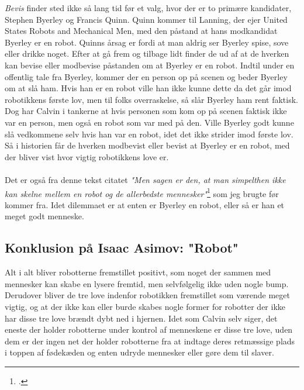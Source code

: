 \textit{Bevis} finder sted ikke så lang tid før et valg, hvor der er to primære kandidater, Stephen Byerley og Francis Quinn. Quinn kommer til Lanning, der ejer United States Robots and Mechanical Men,
med den påstand at hans modkandidat Byerley er en robot. Quinns årsag er fordi at man aldrig ser Byerley spise, sove eller drikke noget. Efter at gå frem og tilbage lidt finder de ud af
at de hverken kan bevise eller modbevise påstanden om at Byerley er en robot. Indtil under en offentlig tale fra Byerley, kommer der en person op på scenen og beder Byerley om at slå ham. Hvis han
er en robot ville han ikke kunne dette da det går imod robotikkens første lov, men til folks overraskelse, så slår Byerley ham rent faktisk. Dog har Calvin i tankerne at hvis personen som kom op
på scenen faktisk ikke var en person, men også en robot som var med på den. Ville Byerley godt kunne slå vedkommene selv hvis han var en robot, idet det ikke strider imod første lov. Så i
historien får de hverken modbevist eller bevist at Byerley er en robot, med der bliver vist hvor vigtig robotikkens love er.
\\
\\
Det er også fra denne tekst citatet \textit{"Men sagen er den, at man simpelthen ikke kan skelne mellem en robot og de allerbedste mennesker"}\footcite[194, l. 5]{robot} som jeg brugte
før kommer fra. Idet dilemmaet er at enten er Byerley en robot, eller så er han et meget godt menneske.

\subsection{Konklusion på Isaac Asimov: "Robot"}

Alt i alt bliver robotterne fremstillet positivt, som noget der sammen med mennesker kan skabe en lysere fremtid, men selvfølgelig ikke uden nogle bump. Derudover bliver
de tre love indenfor robotikken fremstillet som værende meget vigtig, og at der ikke kan eller burde skabes nogle former for robotter der ikke har disse tre love brændt
dybt ned i hjernen. Idet som Calvin selv siger, det eneste der holder robotterne under kontrol af menneskene er disse tre love, uden dem er der ingen net der
holder robotterne fra at indtage deres retmæssige plads i toppen af fødekæden og enten udryde mennesker eller gøre dem til slaver.
